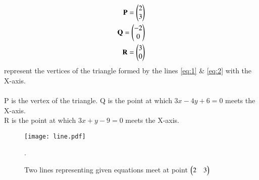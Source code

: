 \documentclass[journal,12pt,twocolumn]{IEEEtran}
\renewcommand\thesection{\arabic{section}}
\begin{document}
\begin{enumerate}[label=\thesection.\arabic*.,ref=\thesection.\theenumi]
\begin{enumerate}
    \begin{align}
        \mathbf{P}=\begin{pmatrix}2\\3\end{pmatrix}\\ \mathbf{Q}=\begin{pmatrix}-2\\0\end{pmatrix}\\ \mathbf{R}=\begin{pmatrix}3\\0\end{pmatrix}\\
    \end{align}
    represent the vertices of the triangle formed by the lines \eqref{eq:1} \& \eqref{eq:2}
    with the X-axis.\\\\

        P is the vertex of the triangle.
        Q is the point at which \(3x-4y+6=0\) meets the X-axis.\\
        R is the point at which \(3x+y-9=0\) meets the X-axis.\\
\end{enumerate}
\begin{figure}[h]
\texttt{[image: line.pdf]}
\caption{Two lines representing given equations meet at point $\begin{pmatrix}2 & 3\end{pmatrix}$ }.
\end{figure}
\end{enumerate}
\end{document}
